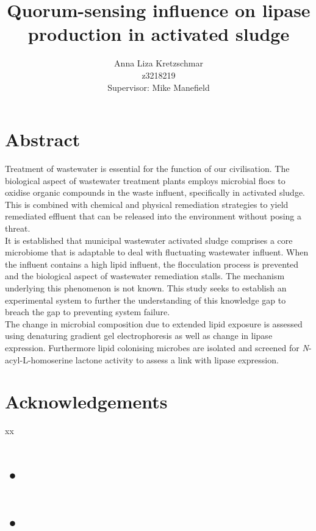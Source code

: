 \documentclass[11pt]{article}
\title{\textbf{Quorum-sensing influence on lipase production in activated sludge}}
\author{Anna Liza Kretzschmar\\
        z3218219\\
        Supervisor: Mike Manefield}
\date{}
\begin{document}
\maketitle
\thispagestyle{empty}
\pagestyle{headings}
\setcounter{page}{1}
\section{Abstract}
Treatment of wastewater is essential for the function of our civilisation. The biological aspect of wastewater treatment plants employs microbial flocs to oxidise organic compounds in the waste influent, specifically in activated sludge. This is combined with chemical and physical remediation strategies to yield remediated effluent that can be released into the environment without posing a  threat. \\

It is established that municipal wastewater activated sludge comprises a core microbiome that is adaptable to deal with fluctuating wastewater influent. When the influent contains a high lipid influent, the flocculation process is prevented and the biological aspect of wastewater remediation stalls. The mechanism underlying this phenomenon is not known. This study seeks to establish an experimental system to further the understanding of this knowledge gap to breach the gap to preventing system failure. \\

The change in microbial composition due to extended lipid exposure is assessed using denaturing gradient gel electrophoresis as well as change in lipase expression. Furthermore lipid colonising microbes are isolated and screened for \emph{N}-acyl-L-homoserine lactone activity to assess a link with lipase expression. 
\newpage
\thispagestyle{empty}
\section{Acknowledgements}
xx
\newpage

\tableofcontents

\newpage



\section{•}
\listoffigures

\newpage
\section{•}
\listoftables
\end{document}
